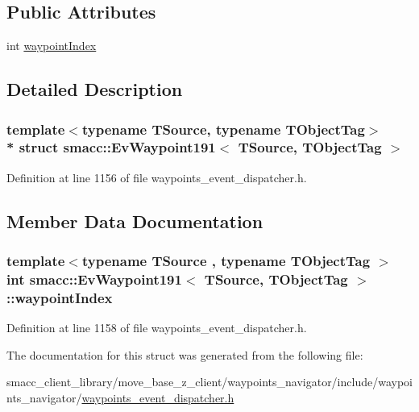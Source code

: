 \subsection*{Public Attributes}
\begin{DoxyCompactItemize}
\item 
int \hyperlink{structsmacc_1_1EvWaypoint191_a1bf55ee4fa32d82f7c791b7df57c9858}{waypoint\+Index}
\end{DoxyCompactItemize}


\subsection{Detailed Description}
\subsubsection*{template$<$typename T\+Source, typename T\+Object\+Tag$>$\\*
struct smacc\+::\+Ev\+Waypoint191$<$ T\+Source, T\+Object\+Tag $>$}



Definition at line 1156 of file waypoints\+\_\+event\+\_\+dispatcher.\+h.



\subsection{Member Data Documentation}
\subsubsection[{\texorpdfstring{waypoint\+Index}{waypointIndex}}]{\setlength{\rightskip}{0pt plus 5cm}template$<$typename T\+Source , typename T\+Object\+Tag $>$ int {\bf smacc\+::\+Ev\+Waypoint191}$<$ T\+Source, T\+Object\+Tag $>$\+::waypoint\+Index}\hypertarget{structsmacc_1_1EvWaypoint191_a1bf55ee4fa32d82f7c791b7df57c9858}{}\label{structsmacc_1_1EvWaypoint191_a1bf55ee4fa32d82f7c791b7df57c9858}


Definition at line 1158 of file waypoints\+\_\+event\+\_\+dispatcher.\+h.



The documentation for this struct was generated from the following file\+:\begin{DoxyCompactItemize}
\item 
smacc\+\_\+client\+\_\+library/move\+\_\+base\+\_\+z\+\_\+client/waypoints\+\_\+navigator/include/waypoints\+\_\+navigator/\hyperlink{waypoints__event__dispatcher_8h}{waypoints\+\_\+event\+\_\+dispatcher.\+h}\end{DoxyCompactItemize}

